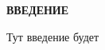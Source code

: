\newpage
\renewcommand{\contentsname}{\centerline{\large ОГЛАВЛЕНИЕ}}
\tableofcontents
\setcounter{page}{2}

\newpage
{}
\begin{center}
	\textbf{\large ВВЕДЕНИЕ}
\end{center}

Тут введение будет
